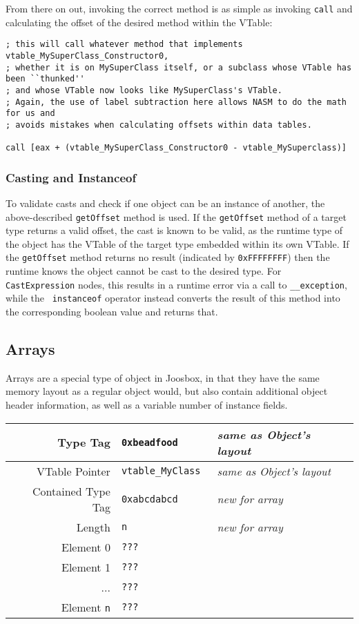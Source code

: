 \documentclass[letterpaper]{article}
\begin{document}
  From there on out, invoking the correct method is as simple as invoking {\tt call} and
  calculating the offset of the desired method within the VTable:

  \begin{verbatim}
; this will call whatever method that implements vtable_MySuperClass_Constructor0,
; whether it is on MySuperClass itself, or a subclass whose VTable has been ``thunked''
; and whose VTable now looks like MySuperClass's VTable.
; Again, the use of label subtraction here allows NASM to do the math for us and
; avoids mistakes when calculating offsets within data tables.

call [eax + (vtable_MySuperClass_Constructor0 - vtable_MySuperclass)]
  \end{verbatim}

  \subsubsection{Casting and Instanceof}

  To validate casts and check if one object can be an instance of another, the
  above-described {\tt getOffset} method is used. If the {\tt getOffset}
  method of a target type returns a valid offset, the cast is known to be
  valid, as the runtime type of the object has the VTable of the target type
  embedded within its own VTable. If the {\tt getOffset} method returns no
  result (indicated by {\tt 0xFFFFFFFF}) then the runtime knows the object
  cannot be cast to the desired type. For {\tt CastExpression} nodes, this
  results in a runtime error via a call to {\tt \_\_exception}, while the {\tt
  instanceof} operator instead converts the result of this method into the
  corresponding boolean value and returns that.

  \subsection{Arrays}

  Arrays are a special type of object in Joosbox, in that they have the same
  memory layout as a regular object would, but also contain additional object
  header information, as well as a variable number of instance fields.

  \begin{center}
  \begin{tabular}{| r | l | l | }
    \hline
    Type Tag & {\tt 0xbeadfood } & {\em same as Object's layout} \\ \hline
    VTable Pointer & {\tt vtable\_MyClass } & {\em same as Object's layout} \\ \hline
    Contained Type Tag & {\tt 0xabcdabcd } & {\em new for array} \\ \hline
    Length & {\tt n } & {\em new for array} \\ \hline
    Element 0 & {\tt ??? } & \\ 
    Element 1 & {\tt ??? } & \\ 
    ... & {\tt ??? } & \\ 
    Element {\tt n} & {\tt ??? } & \\ \hline
  \end{tabular}
\end{center}
\end{document}
